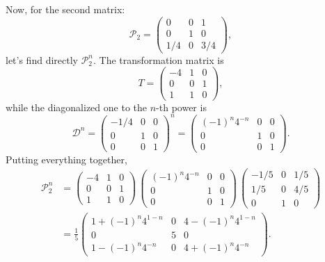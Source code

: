 Now, for the second matrix:
\begin{equation}
  \mathcal{P}_{2} =
  \begin{pmatrix}
    0  &  0  &  1  \\
    0  &  1  &  0  \\
    1/4 &  0  & 3/4
  \end{pmatrix},
\end{equation}
let’s find directly $\mathcal{P}_2^{n}$. The transformation matrix is
\begin{equation}
  T =
  \begin{pmatrix}
    -4 & 1 & 0 \\
    0 & 0 & 1 \\
    1 & 1 & 0
  \end{pmatrix},
\end{equation}
while the diagonalized one to the $n$-th power is
\begin{equation}
  \mathcal{D}^{n} =
  \begin{pmatrix}
    -1/4 & 0 & 0 \\
    0 & 1 & 0 \\
    0 & 0 & 1
  \end{pmatrix}^n
  =
  \begin{pmatrix}
    (-1)^{n} 4^{-n} & 0 & 0 \\
    0 & 1 & 0 \\
    0 & 0 & 1
  \end{pmatrix}.
\end{equation}
Putting everything together,
\begin{equation}
  \begin{split}
    \mathcal{P}_2^{n} &=
    \begin{pmatrix}
      -4 & 1 & 0 \\
      0 & 0 & 1 \\
      1 & 1 & 0
    \end{pmatrix}\,
    \begin{pmatrix}
      (-1)^{n} 4^{-n} & 0 & 0 \\
      0 & 1 & 0 \\
      0 & 0 & 1
    \end{pmatrix}\,
    \begin{pmatrix}
      -1/5 & 0 & 1/5 \\
      1/5 & 0 & 4/5 \\
      0 & 1 & 0
    \end{pmatrix} \\[1ex]
                      &= \frac{1}{5}
                      \begin{pmatrix}
                        1 + (-1)^{n} 4^{1-n} & 0 & 4 - (-1)^{n} 4^{1-n} \\
                        0 & 5 & 0 \\
                        1 - (-1)^{n} 4^{-n} & 0 & 4 + (-1)^{n} 4^{-n}
                      \end{pmatrix}.
  \end{split}
\end{equation}
